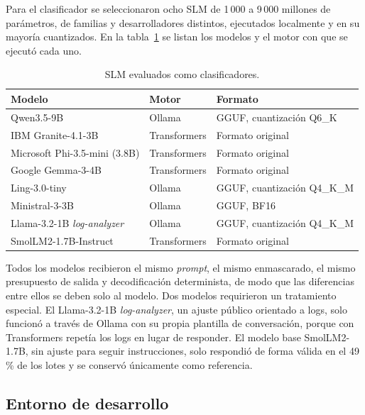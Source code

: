 Para el clasificador se seleccionaron ocho SLM de 1\,000 a 9\,000 millones de parámetros, de familias y desarrolladores distintos, ejecutados localmente y en su mayoría cuantizados. En la tabla~\ref{tab:met_modelos} se listan los modelos y el motor con que se ejecutó cada uno.

\begin{table}[H]
\centering
\caption{SLM evaluados como clasificadores.}
\label{tab:met_modelos}
\small
\begin{tabular}{@{}p{5.6cm}p{2.6cm}p{5.6cm}@{}}
\toprule
\textbf{Modelo} & \textbf{Motor} & \textbf{Formato} \\
\midrule
Qwen3.5-9B & Ollama & GGUF, cuantización Q6\_K \\
IBM Granite-4.1-3B & Transformers & Formato original \\
Microsoft Phi-3.5-mini (3.8B) & Transformers & Formato original \\
Google Gemma-3-4B & Transformers & Formato original \\
Ling-3.0-tiny & Ollama & GGUF, cuantización Q4\_K\_M \\
Ministral-3-3B & Ollama & GGUF, BF16 \\
Llama-3.2-1B \textit{log-analyzer} & Ollama & GGUF, cuantización Q4\_K\_M \\
SmolLM2-1.7B-Instruct & Transformers & Formato original \\
\bottomrule
\end{tabular}
\normalsize
\end{table}

Todos los modelos recibieron el mismo \textit{prompt}, el mismo enmascarado, el mismo presupuesto de salida y decodificación determinista, de modo que las diferencias entre ellos se deben solo al modelo. Dos modelos requirieron un tratamiento especial. El Llama-3.2-1B \textit{log-analyzer}, un ajuste público orientado a logs, solo funcionó a través de Ollama con su propia plantilla de conversación, porque con Transformers repetía los logs en lugar de responder. El modelo base SmolLM2-1.7B, sin ajuste para seguir instrucciones, solo respondió de forma válida en el 49\,\% de los lotes y se conservó únicamente como referencia.

\subsection{Entorno de desarrollo}\label{subsec:met_entorno}

